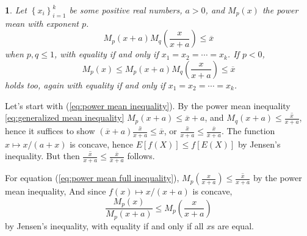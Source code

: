\documentclass{article}
\makeatletter
\theoremstyle{plain}
\theoremstyle{plain}
\newtheorem{lem}{\protect\lemmaname}
\theoremstyle{definition}
\theoremstyle{remark}
\theoremstyle{definition}
\theoremstyle{plain}
\theoremstyle{plain}
\theoremstyle{definition}
\newenvironment{proof}[1][\protect\proofname]{\par
	\normalfont\topsep6\p@\@plus6\p@\relax
	\trivlist
	\itemindent\parindent
	\item[\hskip\labelsep\scshape #1]\ignorespaces
}{%
	\endtrivlist\@endpefalse
}
\providecommand{\proofname}{Proof}
\providecommand{\lemmaname}{Lemma}
\makeatother
\begin{document}
\begin{lem}
\label{lem:power mean lemma}Let $\left\{ x_{i}\right\} _{i=1}^{k}$
be some positive real numbers, $a>0$, and $M_{p}\left(x\right)$
the power mean with exponent $p$. 
\begin{equation}
M_{p}\left(x+a\right)M_{q}\left(\frac{x}{x+a}\right)\leq\overline{x}\label{eq:power mean inequality}
\end{equation}
when $p,q\leq1$, with equality if and only if $x_{1}=x_{2}=\cdots=x_{k}$.
If $p<0$, 
\begin{equation}
M_{p}\left(x\right)\leq M_{p}\left(x+a\right)M_{q}\left(\frac{x}{x+a}\right)\leq\overline{x}\label{eq:power mean full inequality}
\end{equation}
holds too, again with equality if and only if $x_{1}=x_{2}=\cdots=x_{k}$.
\end{lem}

\begin{proof}
Let's start with (\ref{eq:power mean inequality}). By the power
mean inequality \ref{eq:generalized mean inequality}  $M_{p}\left(x+a\right)\leq\overline{x}+a$, and $M_{q}\left(x+a\right)\leq\overline{\frac{x}{x+a}}$,
hence it suffices to show $\left(\overline{x}+a\right)\overline{\frac{x}{x+a}}\leq\overline{x}$,
or $\overline{\frac{x}{x+a}}\leq\frac{\overline{x}}{\overline{x}+a}$.
The function $x\mapsto x/(a+x)$ is concave, hence $E\left[f\left(X\right)\right]\leq f\left[E\left(X\right)\right]$
by Jensen's inequality. But then $\overline{\frac{x}{x+a}}\leq\frac{\overline{x}}{\overline{x}+a}$
follows.

For equation (\ref{eq:power mean full inequality}), $M_{p}\left(\frac{x}{x+a}\right)\leq\overline{\frac{x}{x+a}}$
by the power mean inequality, And since $f\left(x\right)\mapsto x/(x+a)$
is concave,
\[
\frac{M_{p}\left(x\right)}{M_{p}\left(x+a\right)}\leq M_{p}\left(\frac{x}{x+a}\right)
\]
by Jensen's inequality, with equality if and only if all $x$s are
equal.
\end{proof}
\end{document}
